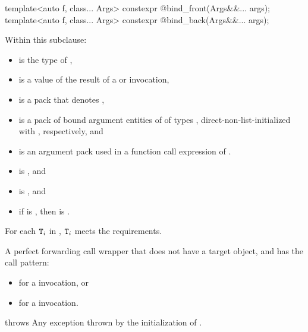 %
%
\begin{itemdecl}
template<auto f, class... Args>
  constexpr @\unspec@ bind_front(Args&&... args);
template<auto f, class... Args>
  constexpr @\unspec@ bind_back(Args&&... args);
\end{itemdecl}

\begin{itemdescr}
\pnum
Within this subclause:
\begin{itemize}
\item
{} is the type of ,
\item
{} is a value of the result of
a  or  invocation,
\item
{} is a pack that denotes ,
\item
{} is a pack of bound argument entities of
 of types ,
direct-non-list-initialized with ,
respectively, and
\item
{} is an argument pack used in
a function call expression of .
\end{itemize}

\pnum
\mandates
\begin{itemize}
\item
{} is , and
\item
{} is , and
\item
if  is ,
then  is .
\end{itemize}

\pnum
\expects
For each $\texttt{\protect T}_i$ in ,
$\texttt{\protect T}_i$ meets the  requirements.

\pnum
\returns
A perfect forwarding call wrapper  that
does not have a target object, and has the call pattern:
\begin{itemize}
\item
{}
for a  invocation, or
\item
{}
for a  invocation.
\end{itemize}

\pnum
throws
Any exception thrown by the initialization of .
\end{itemdescr}

